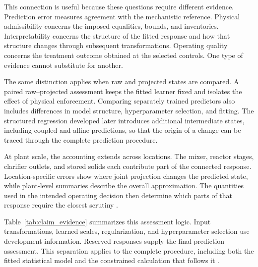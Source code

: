 This connection is useful because these questions require different evidence. Prediction error measures agreement with the mechanistic reference. Physical admissibility concerns the imposed equalities, bounds, and inventories. Interpretability concerns the structure of the fitted response and how that structure changes through subsequent transformations. Operating quality concerns the treatment outcome obtained at the selected controls. One type of evidence cannot substitute for another.

The same distinction applies when raw and projected states are compared. A paired raw--projected assessment keeps the fitted learner fixed and isolates the effect of physical enforcement. Comparing separately trained predictors also includes differences in model structure, hyperparameter selection, and fitting. The structured regression developed later introduces additional intermediate states, including coupled and affine predictions, so that the origin of a change can be traced through the complete prediction procedure.

At plant scale, the accounting extends across locations. The mixer, reactor stages, clarifier outlets, and stored solids each contribute part of the connected response. Location-specific errors show where joint projection changes the predicted state, while plant-level summaries describe the overall approximation. The quantities used in the intended operating decision then determine which parts of that response require the closest scrutiny \citep{BhosekarIerapetritou2018,McBride2019}.

Table~\ref{tab:claim_evidence} summarizes this assessment logic. Input transformations, learned scales, regularization, and hyperparameter selection use development information. Reserved responses supply the final prediction assessment. This separation applies to the complete procedure, including both the fitted statistical model and the constrained calculation that follows it \citep{Kaufman2012}.

